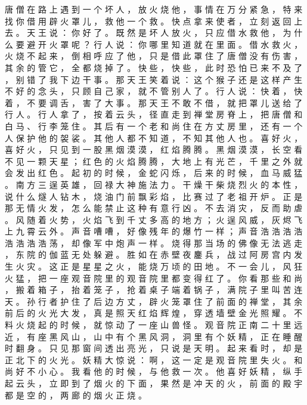 {唐 僧 在 路 上 遇 到 一 个 坏 人 ， 放 火 烧 他 ， 事 情 在 万 分 紧 急 ， 特 来 找 你 借 用 辟 火 罩 儿 ， 救 他 一 个 救 。
快 点 拿 来 使 者 ， 立 刻 返 回 上 去 。
天 王 说 ： 你 好 了 。
既 然 是 坏 人 放 火 ， 只 应 借 水 救 他 ， 为 什 么 要 避 开 火 罩 呢 ？ 行 人 说 ： 你 哪 里 知 道 就 在 里 面 。
借 水 救 火 ， 火 烧 不 起 来 ， 倒 相 呼 应 了 他 ， 只 是 借 此 罩 住 了 唐 僧 没 有 伤 害 ， 其 余 的 管 它 ， 全 都 烧 掉 了 。
快 些 ， 快 些 ， 此 时 恐 怕 已 来 不 及 了 ， 别 错 了 我 下 边 干 事 。
那 天 王 笑 着 说 ： 这 个 猴 子 还 是 这 样 产 生 不 好 的 念 头 ， 只 顾 自 己 家 ， 就 不 管 别 人 了 。
行 人 说 ： 快 着 ， 快 着 ， 不 要 调 舌 ， 害 了 大 事 。
那 天 王 不 敢 不 借 ， 就 把 罩 儿 送 给 了 行 人 。
行 人 拿 了 ， 按 着 云 头 ， 径 直 走 到 禅 堂 房 脊 上 ， 把 唐 僧 和 白 马 、 行 李 笼 住 。
其 后 有 一 个 老 和 尚 住 在 方 丈 房 里 ， 还 有 一 个 人 保 护 他 的 袈 裟 。
其 他 人 都 不 知 道 ， 不 知 其 他 人 也 。
喜 好 火 ， 喜 好 火 ， 只 见 到 一 股 黑 烟 漠 漠 ， 红 焰 腾 腾 。
黑 烟 漠 漠 ， 长 空 看 不 见 一 颗 天 星 ； 红 色 的 火 焰 腾 腾 ， 大 地 上 有 光 芒 ， 千 里 之 外 就 会 发 出 红 色 。
起 初 的 时 候 ， 金 蛇 闪 烁 ， 后 来 的 时 候 ， 血 马 威 猛 。
南 方 三 逞 英 雄 ， 回 禄 大 神 施 法 力 。
干 燥 干 柴 烧 烈 火 的 本 性 ， 说 什 么 燧 人 钻 木 ， 烧 油 门 前 飘 彩 焰 ， 比 赛 过 了 老 祖 开 炉 。
正 是 那 无 情 火 发 ， 怎 么 能 禁 止 这 种 有 意 行 凶 。
不 去 消 灾 ， 反 而 助 虐 。
风 随 着 火 势 ， 火 焰 飞 到 千 丈 多 高 的 地 方 ； 火 逞 风 威 ， 灰 烬 飞 上 九 霄 云 外 。
声 音 嘈 嘈 ， 好 像 残 年 的 爆 竹 一 样 ； 声 音 浩 浩 浩 浩 浩 浩 浩 浩 荡 ， 却 像 军 中 炮 声 一 样 。
烧 得 那 当 场 的 佛 像 无 法 逃 走 ， 东 院 的 伽 蓝 无 处 躲 避 。
胜 如 在 赤 壁 夜 鏖 兵 ， 战 过 阿 房 宫 内 发 生 火 灾 。
这 正 是 星 星 之 火 ， 能 烧 万 顷 的 田 地 。
不 一 会 儿 ， 风 狂 火 猛 ， 把 一 座 观 音 院 里 的 观 音 院 里 都 变 得 红 了 。
你 看 那 些 和 尚 ， 搬 着 箱 子 ， 抬 着 笼 子 ， 抢 着 桌 子 端 着 锅 子 ， 满 院 子 里 叫 苦 连 天 。
孙 行 者 护 住 了 后 边 方 丈 ， 辟 火 笼 罩 住 了 前 面 的 禅 堂 ， 其 余 前 后 的 火 光 大 发 ， 真 是 照 天 红 焰 辉 煌 ， 穿 透 墙 壁 金 光 照 耀 。
不 料 火 烧 起 的 时 候 ， 就 惊 动 了 一 座 山 兽 怪 。
观 音 院 正 南 二 十 里 远 近 ， 有 座 黑 风 山 ， 山 中 有 个 黑 风 洞 ， 洞 里 有 个 妖 精 ， 正 在 睡 醒 时 翻 身 。
只 见 那 窗 间 透 出 亮 光 ， 只 说 是 天 明 。
起 来 看 时 ， 却 是 正 北 下 的 火 光 。
妖 精 大 惊 说 ： 啊 ， 这 一 定 是 观 音 院 里 失 火 。
和 尚 好 不 小 心 。
我 看 他 的 时 候 ， 与 他 救 一 次 。
他 喜 好 妖 精 ， 纵 手 起 云 头 ， 立 即 到 了 烟 火 的 下 面 ， 果 然 是 冲 天 的 火 ， 前 面 的 殿 宇 都 是 空 的 ， 两 廊 的 烟 火 正 烧 。
}
